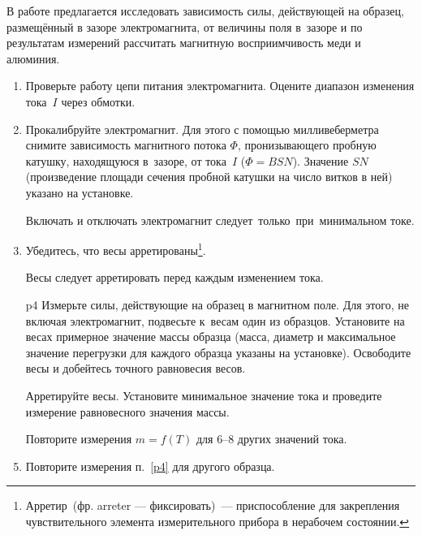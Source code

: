 \begin{lab:task}

В работе предлагается исследовать зависимость силы, действующей на образец, размещённый в зазоре электромагнита, от
величины поля в~зазоре и по результатам измерений рассчитать магнитную восприимчивость меди и алюминия.

\begin{enumerate}


\item Проверьте работу цепи питания электромагнита. Оцените диапазон изменения тока~$I$ через обмотки.

\item Прокалибруйте электромагнит. Для этого с помощью милливеберметра снимите зависимость магнитного потока $\Phi$,
пронизывающего пробную катушку, находящуюся в~зазоре, от тока~$I$ ($\Phi=BSN$). Значение $SN$ (произведение площади
сечения пробной катушки на число витков в ней) указано на установке.

\begin{lab:warning}
	Включать и отключать электромагнит следует~только~при~минимальном токе.
\end{lab:warning}

\item Убедитесь, что весы арретированы\footnote{Арретир~(фр. arreter --- фиксировать)~--- приспособление для закрепления
чувствительного элемента измерительного прибора в нерабочем состоянии.}.

\begin{lab:warning}
	Весы следует арретировать перед каждым изменением тока.
\end{lab:warning}

\item[p4] Измерьте силы, действующие на образец в магнитном поле. Для этого, не включая электромагнит, подвесьте к~весам
один из образцов. Установите на весах примерное значение массы образца (масса, диаметр и максимальное значение
перегрузки для каждого образца указаны на установке). Освободите весы и добейтесь точного равновесия весов.

Арретируйте весы. Установите минимальное значение тока и проведите измерение равновесного значения массы.

Повторите измерения $m=f(T)$ для 6--8 других значений тока.

\item Повторите измерения п.~\ref{p4} для другого образца.


\end{enumerate}
\end{lab:task}
